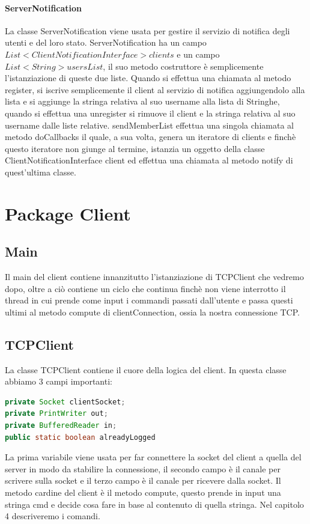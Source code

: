 \documentclass[]{article}
\begin{document}
\paragraph{ServerNotification}
\label{serverRMI} La classe ServerNotification viene usata per gestire il servizio di notifica degli utenti e del loro stato. ServerNotification ha un campo\\ $List<ClientNotificationInterface> clients$ e un campo $List<String> usersList$, il suo metodo costruttore è semplicemente l'istanziazione di queste due liste. Quando si effettua una chiamata al metodo register, si iscrive semplicemente il client al servizio di notifica aggiungendolo alla lista e si aggiunge la stringa relativa al suo username alla lista di Stringhe, quando si effettua una unregister si rimuove il client e la stringa relativa al suo username dalle liste relative.
sendMemberList effettua una singola chiamata al metodo doCallbacks il quale, a sua volta, genera un iteratore di clients e finchè questo iteratore non giunge al termine, istanzia un oggetto della classe ClientNotificationInterface client ed effettua una chiamata al metodo notify di quest'ultima classe.\newpage
\section{Package Client}
\subsection{Main}
Il main del client contiene innanzitutto l'istanziazione di TCPClient che vedremo dopo, oltre a ciò contiene un ciclo che continua finchè non viene interrotto il thread in cui prende come input i commandi passati dall'utente e passa questi ultimi al metodo compute di clientConnection, ossia la nostra connessione TCP.
\subsection{TCPClient}
La classe TCPClient contiene il cuore della logica del client. In questa classe abbiamo 3 campi importanti:
\begin{lstlisting}[language=java]
private Socket clientSocket;
private PrintWriter out;
private BufferedReader in;
public static boolean alreadyLogged
\end{lstlisting}
La prima variabile viene usata per far connettere la socket del client a quella del server in modo da stabilire la connessione, il secondo campo è il canale per scrivere sulla socket e il terzo campo è il canale per ricevere dalla socket.
Il metodo cardine del client è il metodo compute, questo prende in input una stringa cmd e decide cosa fare in base al contenuto di quella stringa.
Nel capitolo 4 descriveremo i comandi.
\end{document}
